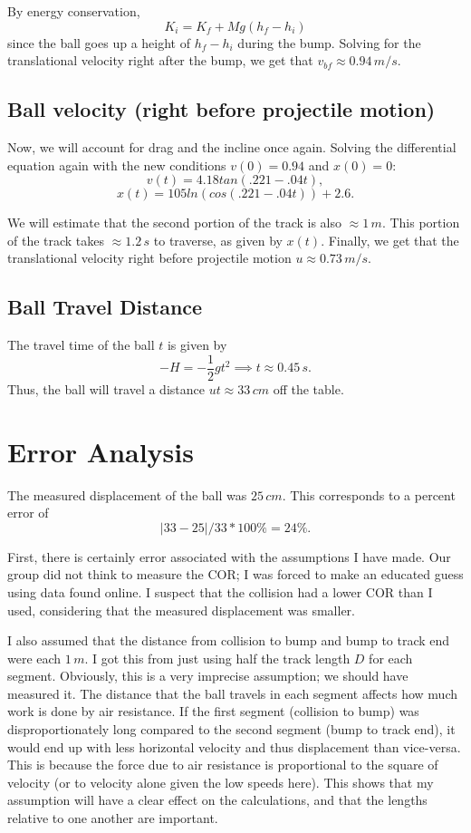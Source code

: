 \documentclass[12pt]{article} %
\begin{document}
By energy conservation,
$$K_i = K_f + Mg(h_f - h_i)$$
since the ball goes up a height of $h_f - h_i$ during the bump.
Solving for the translational velocity right after the bump, we get that $v_{bf} \approx 0.94\,m/s$.

\subsection{Ball velocity (right before projectile motion)}

Now, we will account for drag and the incline once again.
Solving the differential equation again with the new conditions $v(0) = 0.94$ and $x(0) = 0$: $$v(t) = 4.18tan(.221 - .04t),$$ $$x(t) = 105ln(cos(.221 - .04t)) + 2.6.$$

We will estimate that the second portion of the track is also $\approx 1\, m$. This portion of the track takes $\approx 1.2\,s$ to traverse, as given by $x(t)$. Finally, we get that the translational velocity right before projectile motion $u \approx 0.73\, m/s$.

\subsection{Ball Travel Distance}

The travel time of the ball $t$ is given by
$$-H = -\frac{1}{2}gt^2 \implies t \approx 0.45\,s.$$
Thus, the ball will travel a distance $ut \approx 33\,cm$ off the table.

\section{Error Analysis}

The measured displacement of the ball was $25\,cm$. This corresponds to a percent error of $$|33 - 25|/33 * 100\% = 24\%.$$

First, there is certainly error associated with the assumptions I have made. Our group did not think to measure the COR; I was forced to make an educated guess using data found online. I suspect that the collision had a lower COR than I used, considering that the measured displacement was smaller.

I also assumed that the distance from collision to bump and bump to track end were each $1\,m$. I got this from just using half the track length $D$ for each segment. Obviously, this is a very  imprecise assumption; we should have measured it. The distance that the ball travels in each segment affects how much work is done by air resistance. If the first segment (collision to bump) was disproportionately long compared to the second segment (bump to track end), it would end up with less horizontal velocity and thus displacement than vice-versa. This is because the force due to air resistance is proportional to the square of velocity (or to velocity alone given the low speeds here). This shows that my assumption will have a clear effect on the calculations, and that the lengths relative to one another are important.
\end{document}
